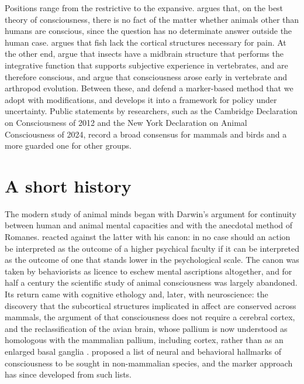 \documentclass{situationist-preprint}
\begin{document}
Positions range from the restrictive to the expansive. \citet{Carruthers2019} argues that, on the best theory of consciousness, there is no fact of the matter whether animals other than humans are conscious, since the question has no determinate answer outside the human case. \citet{Key2016} argues that fish lack the cortical structures necessary for pain. At the other end, \citet{Barron2016} argue that insects have a midbrain structure that performs the integrative function that supports subjective experience in vertebrates, and are therefore conscious, and \citet{Feinberg2016} argue that consciousness arose early in vertebrate and arthropod evolution. Between these, \citet{Birch2020} and \citet{Birch2022} defend a marker-based method that we adopt with modifications, and \citet{Birch2024} develops it into a framework for policy under uncertainty. Public statements by researchers, such as the Cambridge Declaration on Consciousness of 2012 and the New York Declaration on Animal Consciousness of 2024, record a broad consensus for mammals and birds and a more guarded one for other groups.

\section{A short history}

The modern study of animal minds began with Darwin's argument for continuity between human and animal mental capacities and with the anecdotal method of Romanes. \citet{Morgan1894} reacted against the latter with his canon: in no case should an action be interpreted as the outcome of a higher psychical faculty if it can be interpreted as the outcome of one that stands lower in the psychological scale. The canon was taken by behaviorists as licence to eschew mental ascriptions altogether, and for half a century the scientific study of animal consciousness was largely abandoned. Its return came with cognitive ethology and, later, with neuroscience: the discovery that the subcortical structures implicated in affect are conserved across mammals, the argument of \citet{Merker2007} that consciousness does not require a cerebral cortex, and the reclassification of the avian brain, whose pallium is now understood as homologous with the mammalian pallium, including cortex, rather than as an enlarged basal ganglia \citep{Jarvis2005}. \citet{Edelman2005} proposed a list of neural and behavioral hallmarks of consciousness to be sought in non-mammalian species, and the marker approach has since developed from such lists.
\end{document}

